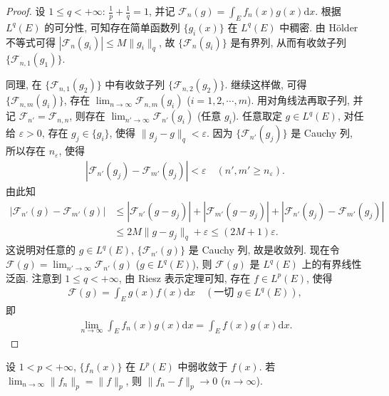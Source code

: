 \documentclass[../../main.tex]{subfiles}%
\begin{document}
\begin{proof}
设 $1\leqslant q<+\infty$: $\frac{1}{p}+\frac{1}{q}=1$, 并记 $\mathscr{F}_n(g)=\int_E f_n(x)g(x)\mathrm{d}x$. 根据 $L^q(E)$ 的可分性, 可知存在简单函数列 $\{g_i(x)\}$ 在 $L^q(E)$ 中稠密. 由 Hölder 不等式可得 $|\mathscr{F}_n(g_i)|\leqslant M\|g_i\|_q$, 故 $\{\mathscr{F}_n(g_i)\}$ 是有界列, 从而有收敛子列 $\{\mathscr{F}_{n,1}(g_1)\}$.

同理, 在 $\{\mathscr{F}_{n,1}(g_2)\}$ 中有收敛子列 $\{\mathscr{F}_{n,2}(g_2)\}$. 继续这样做, 可得 $\{\mathscr{F}_{n,m}(g_i)\}$, 存在 $\lim_{n\to\infty}\mathscr{F}_{n,m}(g_i)$ ($i=1,2,\cdots,m$). 用对角线法再取子列, 并记 $\mathscr{F}_{n'}=\mathscr{F}_{n,n}$, 则存在 $\lim_{n'\to\infty}\mathscr{F}_{n'}(g_i)$ (任意 $g_i$). 任意取定 $g\in L^q(E)$, 对任给 $\varepsilon>0$, 存在 $g_j\in\{g_i\}$, 使得 $\|g_j-g\|_q<\varepsilon$. 因为 $\{\mathscr{F}_{n'}(g_j)\}$ 是 Cauchy 列, 所以存在 $n_\varepsilon$, 使得
\begin{align*}
|\mathscr{F}_{n'}(g_j)-\mathscr{F}_{m'}(g_j)|<\varepsilon\quad (n',m'\geqslant n_\varepsilon).
\end{align*}
由此知
\begin{align*}
|\mathscr{F}_{n'}(g)-\mathscr{F}_{m'}(g)|
&\leqslant|\mathscr{F}_{n'}(g-g_j)|+|\mathscr{F}_{m'}(g-g_j)|+|\mathscr{F}_{n'}(g_j)-\mathscr{F}_{m'}(g_j)| \\
&\leqslant 2M\|g-g_j\|_q+\varepsilon\leqslant(2M+1)\varepsilon.
\end{align*}
这说明对任意的 $g\in L^q(E)$, $\{\mathscr{F}_{n'}(g)\}$ 是 Cauchy 列, 故是收敛列. 现在令 $\mathscr{F}(g)=\lim_{n'\to\infty}\mathscr{F}_{n'}(g)$ ($g\in L^q(E)$), 则 $\mathscr{F}(g)$ 是 $L^q(E)$ 上的有界线性泛函. 注意到 $1\leqslant q<+\infty$, 由 Riesz 表示定理可知, 存在 $f\in L^p(E)$, 使得
\begin{align*}
\mathscr{F}(g)=\int_E g(x)f(x)\mathrm{d}x\quad (\text{一切 } g\in L^q(E)),
\end{align*}
即
\begin{align*}
\lim_{n\to\infty}\int_E f_n(x)g(x)\mathrm{d}x=\int_E f(x)g(x)\mathrm{d}x.
\end{align*}
\end{proof}

\begin{theorem}
设 $1<p<+\infty$, $\{f_n(x)\}$ 在 $L^p(E)$ 中弱收敛于 $f(x)$. 若 $\lim_{n\to\infty}\|f_n\|_p=\|f\|_p$, 则 $\|f_n-f\|_p\to 0$ ($n\to\infty$).
\end{theorem}
\end{document}
